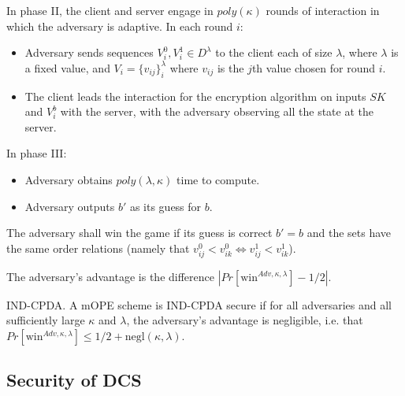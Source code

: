 \documentclass[12pt]{article}
\newenvironment{definition}[1][Definition]{\begin{trivlist}
\item[\hskip \labelsep {\bfseries #1}]}{\end{trivlist}}
\begin{document}
In phase II, the client and server engage in $poly(\kappa)$ rounds of interaction in which the adversary is adaptive. In each round $i$:

\begin{itemize}
  \item Adversary sends sequences $V_i^0, V_i^1 \in D^{\lambda}$ to the client each of size $\lambda$, where $\lambda$ is a fixed value, and $V_i = \{ v_{ij} \}_i^{\lambda}$ where $v_{ij}$ is the $j$th value chosen for round $i$.
  \item The client leads the interaction for the encryption algorithm on inputs $SK$ and $V_i^b$ with the server, with the adversary observing all the state at the server.
\end{itemize}

In phase III:

\begin{itemize}
  \item Adversary obtains $poly(\lambda, \kappa)$ time to compute.
  \item Adversary outputs $b'$ as its guess for $b$. 
\end{itemize}

The adversary shall win the game if its guess is correct $b' = b$ and the sets have the same order relations (namely that $v_{ij}^0 < v_{ik}^0 \Leftrightarrow v_{ij}^1 < v_{ik}^1$). 

\begin{definition}
  The adversary's advantage is the difference $|Pr[\textrm{win}^{Adv, \kappa, \lambda}] - 1/2|$.
\end{definition}

\begin{definition}
  IND-CPDA. A mOPE scheme is IND-CPDA secure if for all adversaries and all sufficiently large $\kappa$ and $\lambda$, the adversary's advantage is negligible, i.e. that $Pr[\textrm{win}^{Adv, \kappa, \lambda}] \leq 1/2 + \textrm{negl}(\kappa, \lambda)$.
\end{definition}

\subsection{Security of DCS}
\end{document}

